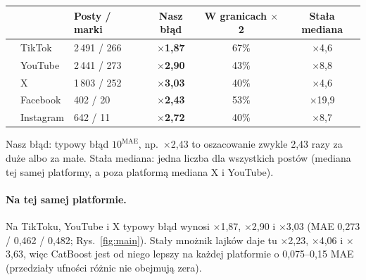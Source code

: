 \documentclass[10pt,a4paper]{article}
\newcommand{\x}[1]{$\times$#1}
\begin{document}
\begin{tcolorbox}[colback=blue!4,colframe=blue!45!black,boxrule=.6pt,left=4pt,right=4pt,top=3pt,bottom=3pt,
  title={\textbf{Główne wyniki: o ile mylimy się na pojedynczym poście}},fonttitle=\small,coltitle=white,colbacktitle=blue!45!black]
\centering\small
\begin{tabular}{lllccc}
 & & Posty / marki & \textbf{Nasz błąd} & W granicach \x{2} & Stała mediana \\
\midrule
{} & TikTok & 2\,491 / 266 & \textbf{\x{1,87}} & 67\% & \x{4,6} \\
 & YouTube & 2\,441 / 273 & \textbf{\x{2,90}} & 43\% & \x{8,8} \\
 & X & 1\,803 / 252 & \textbf{\x{3,03}} & 40\% & \x{4,6} \\
\midrule
{} & Facebook & 402 / 20 & \textbf{\x{2,43}} & 53\% & \x{19,9} \\
 & Instagram & 642 / 11 & \textbf{\x{2,72}} & 40\% & \x{8,7} \\
\end{tabular}

\smallskip\raggedright\footnotesize Nasz błąd: typowy błąd $10^{\text{MAE}}$, np.\ \x{2,43} to oszacowanie zwykle 2,43 razy za duże
albo za małe. Stała mediana: jedna liczba dla wszystkich postów (mediana tej samej platformy, a poza platformą mediana
X i YouTube).
\end{tcolorbox}

\paragraph{Na tej samej platformie.} Na TikToku, YouTube i X typowy błąd wynosi \x{1,87}, \x{2,90} i \x{3,03}
(MAE 0,273 / 0,462 / 0,482; Rys.~\ref{fig:main}). Stały mnożnik lajków daje tu \x{2,23}, \x{4,06} i \x{3,63}, więc
CatBoost jest od niego lepszy na każdej platformie o 0,075--0,15 MAE (przedziały ufności różnic nie obejmują zera).
\end{document}
